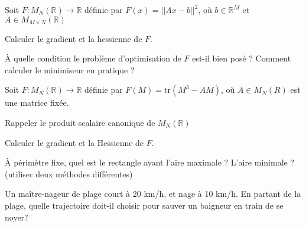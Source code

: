 \documentclass[12pt,a4paper,fleqn]{report}
\newcommand{\R}{\mathbb R}
\begin{document}
\begin{exercice}
  Soit $F : M_{N}(\R) \to \R$ définie par $F(x) = ||{A x - b}||^{2}$, où
  $b \in \R^{M}$ et $A \in M_{M \times N}(\R)$
  \begin{questions}
  \item Calculer le gradient et la hessienne de $F$.
  \item À quelle condition le problème d'optimisation de $F$ est-il
    bien posé ? Comment calculer le minimiseur en pratique ?
  \end{questions}
\end{exercice}

\begin{exercice}
  Soit $F : M_{N}(\R) \to \R$ définie par $F(M) = \text{tr}(M^{3} - A
  M)$, où $A \in M_{N}(R)$ est une matrice fixée.
  \begin{questions}
  \item Rappeler le produit scalaire canonique de $M_{N}(\R)$
  \item Calculer le gradient et la Hessienne de $F$.
  \end{questions}
\end{exercice}

\begin{exercice}
  À périmètre fixe, quel est le rectangle ayant l'aire maximale ?
  L'aire minimale ? (utiliser deux méthodes différentes)
\end{exercice}

\begin{exercice}
  Un maître-nageur de plage court à 20 km/h, et nage à 10 km/h. En
  partant de la plage, quelle trajectoire doit-il choisir pour sauver
  un baigneur en train de se noyer?
\end{exercice}
\end{document}
